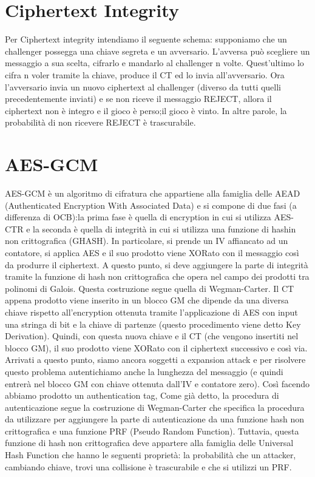 \documentclass{article}
\begin{document}
\section{Ciphertext Integrity}
Per Ciphertext integrity intendiamo il seguente schema: supponiamo che un challenger possegga una chiave segreta e un avversario. L'avversa può scegliere un messaggio a sua scelta, cifrarlo e mandarlo al challenger n volte\@. Quest'ultimo lo cifra n voler tramite la chiave, produce il CT ed lo invia all'avversario\@.
Ora l'avversario invia un nuovo ciphertext al challenger (diverso da tutti quelli precedentemente inviati) e se non riceve il messaggio REJECT, allora il ciphertext non è integro e il gioco è perso;\@altrimenti il gioco è vinto\@.\newline
In altre parole, la probabilità di non ricevere REJECT è trascurabile\@.
\section{AES-GCM}
AES-GCM è un algoritmo di cifratura che appartiene alla famiglia delle AEAD (Authenticated Encryption With Associated Data) e si compone di due fasi (a differenza di OCB):\@ la prima fase è quella di encryption in cui si utilizza AES-CTR e la seconda è quella di integrità in cui si utilizza una funzione di hashin non crittografica (GHASH)\@.\newline
In particolare, si prende un IV affiancato ad un contatore, si applica AES e il suo prodotto viene XORato con il messaggio così da produrre il ciphertext\@.
A questo punto, si deve aggiungere la parte di integrità tramite la funzione di hash non crittografica che opera nel campo dei prodotti tra polinomi di Galois\@. Questa costruzione segue quella di Wegman-Carter\@. Il CT appena prodotto viene inserito in un blocco GM che dipende da una diversa chiave rispetto all'encryption ottenuta tramite l'applicazione di AES con input una stringa di bit e la chiave di partenze (questo procedimento viene detto Key Derivation)\@.
Quindi, con questa nuova chiave e il CT (che vengono insertiti nel blocco GM), il suo prodotto viene XORato con il ciphertext successivo e così via\@.\newline
Arrivati a questo punto, siamo ancora soggetti a expansion attack e per risolvere questo problema autentichiamo anche la lunghezza del messaggio (e quindi entrerà nel blocco GM con chiave ottenuta dall'IV e contatore zero)\@. Così facendo abbiamo prodotto un authentication tag\@,\newline
Come già detto, la procedura di autenticazione segue la costruzione di Wegman-Carter che specifica la procedura da utilizzare per aggiungere la parte di autenticazione da una funzione hash non crittografica e una funzione PRF (Pseudo Random Function)\@. Tuttavia, questa funzione di hash non crittografica deve appartere alla famiglia delle Universal Hash Function che hanno le seguenti proprietà: la probabilità che un attacker, cambiando chiave, trovi una collisione è trascurabile e che si utilizzi un PRF\@.
\end{document}
